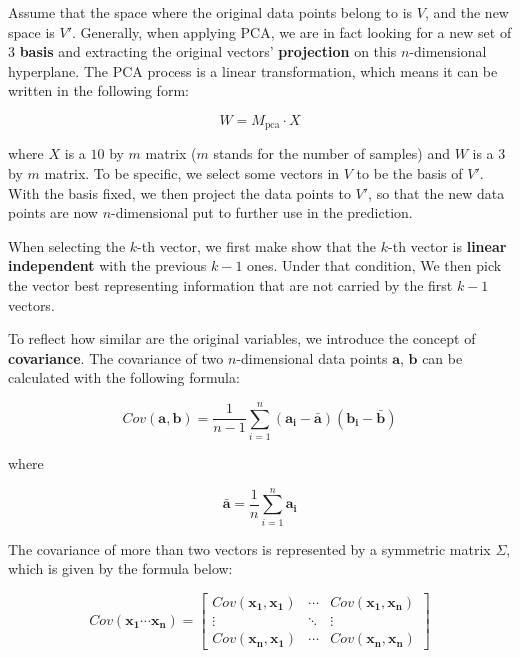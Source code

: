 \documentclass[12pt]{article}
\begin{document}
Assume that the space where the original data points belong to is $V$, and the new space is $V'$. Generally, when applying PCA, we are in fact looking for a new set of 3 \textbf{basis} and extracting the original vectors' \textbf{projection} on this $n$-dimensional hyperplane. The PCA process is a linear transformation, which means it can be written in the following form:

\begin{equation}
    \label{PCA:main}
    W = M_{\text{pca}} \cdot X
\end{equation}

where $X$ is a $10$ by $m$ matrix ($m$ stands for the number of samples) and $W$ is a $3$ by $m$ matrix. To be specific, we select some vectors in $V$ to be the basis of $V'$. With the basis fixed, we then project the data points to $V'$, so that the new data points are now $n$-dimensional put to further use in the  prediction.

When selecting the $k$-th vector, we first make show that the $k$-th vector is \textbf{linear independent} with the previous $k-1$ ones. Under that condition, We then pick the vector best representing information that are not carried by the first $k-1$ vectors.

To reflect how similar are the original variables, we introduce the concept of \textbf{covariance}. The covariance of two $n$-dimensional data points $\boldsymbol{a}$, $\boldsymbol{b}$ can be calculated with the following formula:

\begin{equation}
    Cov(\boldsymbol{a}, \boldsymbol{b}) = \frac{1}{n-1} \sum\limits_{i=1}^n 
    (\boldsymbol{a_i} - \bar{\boldsymbol{a}}) (\boldsymbol{b_i} - \bar{\boldsymbol{b}}) 
\end{equation}

where

\begin{equation}
    \bar{\boldsymbol{a}} = \frac 1 n \sum\limits_{i = 1}^n \boldsymbol{a_i}
\end{equation}

The covariance of more than two vectors is represented by a symmetric matrix $\Sigma$, which is given by the formula below:

\begin{equation}
    Cov(\boldsymbol{x_1} \cdots \boldsymbol{x_n}) = 
    \begin{bmatrix}
        Cov(\boldsymbol{x_1}, \boldsymbol{x_1}) & \cdots & Cov(\boldsymbol{x_1}, \boldsymbol{x_n}) \\
        \vdots & \ddots & \vdots \\
        Cov(\boldsymbol{x_n}, \boldsymbol{x_1}) & \cdots & Cov(\boldsymbol{x_n}, \boldsymbol{x_n})
    \end{bmatrix}
\end{equation}
\end{document}
